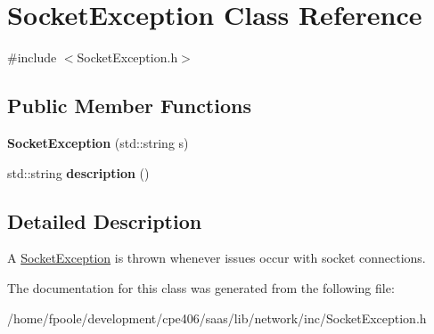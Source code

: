 \hypertarget{class_socket_exception}{}\section{Socket\+Exception Class Reference}
\label{class_socket_exception}


{\ttfamily \#include $<$Socket\+Exception.\+h$>$}

\subsection*{Public Member Functions}
\begin{DoxyCompactItemize}
\item 
\hypertarget{class_socket_exception_a09ddb0c061c40fcb527ff89a2e803342}{}{\bfseries Socket\+Exception} (std\+::string s)\label{class_socket_exception_a09ddb0c061c40fcb527ff89a2e803342}

\item 
\hypertarget{class_socket_exception_ad7920caebddc99b6bbb7dbede569fa18}{}std\+::string {\bfseries description} ()\label{class_socket_exception_ad7920caebddc99b6bbb7dbede569fa18}

\end{DoxyCompactItemize}


\subsection{Detailed Description}
A \hyperlink{class_socket_exception}{Socket\+Exception} is thrown whenever issues occur with socket connections. 

The documentation for this class was generated from the following file\+:\begin{DoxyCompactItemize}
\item 
/home/fpoole/development/cpe406/saas/lib/network/inc/Socket\+Exception.\+h\end{DoxyCompactItemize}
